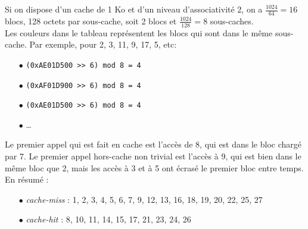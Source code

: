 \documentclass[11pt, a4 paper]{article}
\begin{document}
Si on dispose d'un cache de 1 Ko et d'un niveau d'associativité 2, on a $\frac{1024}{64} = 16$ blocs, 128 octets par sous-cache, soit 2 blocs et $\frac{1024}{128} = 8$ sous-caches.\\
Les couleurs dans le tableau représentent les blocs qui sont dans le même sous-cache.
Par exemple, pour 2, 3, 11, 9, 17, 5, etc:
\begin{itemize}
    \item[$\bullet$] \texttt{(0xAE01D500 >> 6) mod 8 = 4}
    \item[$\bullet$] \texttt{(0xAF01D900 >> 6) mod 8 = 4}
    \item[$\bullet$] \texttt{(0xAE01D500 >> 6) mod 8 = 4}
    \item[$\bullet$] \dots\\
\end{itemize}

Le premier appel qui est fait en cache est l'accès de 8, qui est dans le bloc chargé par 7.
Le premier appel hors-cache non trivial est l'accès à 9, qui est bien dans le même bloc que 2, mais les accès à 3 et à 5 ont écrasé le premier bloc entre temps.\\
En résumé :
\begin{itemize}
    \item[$\bullet$] \textit{cache-miss} : 1, 2, 3, 4, 5, 6, 7, 9, 12, 13, 16, 18, 19, 20, 22, 25, 27
    \item[$\bullet$] \textit{cache-hit} : 8, 10, 11, 14, 15, 17, 21, 23, 24, 26
\end{itemize}





\end{document}
